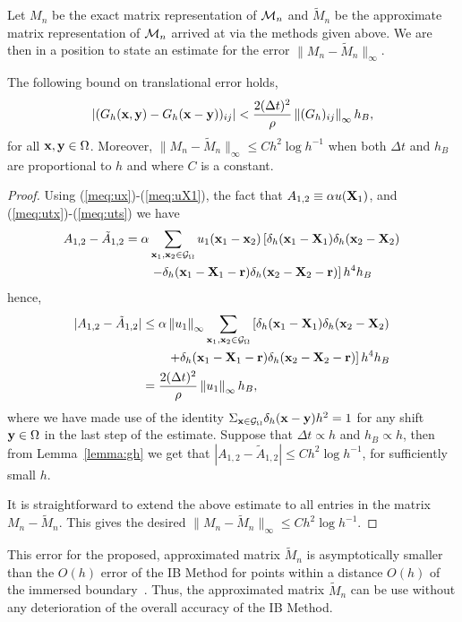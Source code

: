 Let $M_n$ be the exact matrix representation of $\mathcal{M}_n$ and $\tilde{M}_n$ be the approximate matrix representation of $\mathcal{M}_n$ arrived at via the methods given above. 
We are then in a position to state an estimate for the error $\|M_n-\tilde{M}_n\|_{\infty}$.
\begin{theorem}
\label{thm:A}
The following bound on translational error holds,
\begin{equation}
|(G_h(\mathbf{x},\mathbf{y})-G_h(\mathbf{x}-\mathbf{y}))_{ij}|
< 
\frac{2(\Delta t)^2}{\rho} \left\lVert(G_h)_{ij}\right\rVert_\infty h_B,
\label{meq:TranslationBound_Preliminary}
\end{equation}
for all $\mathbf{x},\mathbf{y} \in\Omega$.
Moreover,
$\|M_n-\tilde{M}_n\|_{\infty} \leq C h^2 \log h^{-1}$ when both $\Delta t$ and $h_B$ are  proportional to $h$ and where $C$ is a constant. 
\end{theorem}
\begin{proof}
Using (\ref{meq:ux})-(\ref{meq:uX1}), the fact that $A_{1,2} \equiv \alpha u(\mathbf{X}_1)$, and (\ref{meq:utx})-(\ref{meq:uts}) we have
\begin{align}
\begin{split}
A_{1,2}-\tilde{A}_{1,2} &= 
\alpha\sum_{\mathbf{x}_1,\mathbf{x}_2\in\mathcal{G}_\Omega}
u_1(\mathbf{x}_1 - \mathbf{x}_2)
\left[
\delta_h(\mathbf{x}_1 - \mathbf{X}_1)
\delta_h(\mathbf{x}_2 - \mathbf{X}_2) \right. \\ &\qquad\left.
-
\delta_h(\mathbf{x}_1 - \mathbf{X}_1 - \mathbf{r})
\delta_h(\mathbf{x}_2 - \mathbf{X}_2 - \mathbf{r})
\right]h^4h_B
\end{split}
\end{align}
hence,
\begin{align}
\begin{split}
|A_{1,2}-\tilde{A}_{1,2}|
&\leq 
\alpha\left\lVert u_1\right\rVert_\infty
\sum_{\mathbf{x}_1,\mathbf{x}_2\in\mathcal{G}_\Omega}
\left[
\delta_h(\mathbf{x}_1 - \mathbf{X}_1)
\delta_h(\mathbf{x}_2 - \mathbf{X}_2) \right. \\ &\qquad\left.
+
\delta_h(\mathbf{x}_1 - \mathbf{X}_1 - \mathbf{r})
\delta_h(\mathbf{x}_2 - \mathbf{X}_2 - \mathbf{r})
\right]h^4h_B \\
&=
\frac{2(\Delta t)^2}{\rho} \left\lVert u_1\right\rVert_\infty h_B,
\end{split}
\end{align}
where we have made use of the identity $\Sigma_{\mathbf{x}\in\mathcal{G}_\Omega}\delta_h(\mathbf{x}-\mathbf{y})h^2=1$ for any shift $\mathbf{y}\in\Omega$ in the last step of the estimate.
Suppose that $\Delta t \propto h$ and $h_B \propto h$, then  from Lemma~\ref{lemma:gh} we get that 
$|A_{1,2}-\tilde{A}_{1,2}| \leq C h^2 \log h^{-1}$, for sufficiently small
$h$.

It is straightforward to extend the above estimate to all entries in the matrix $M_n-\tilde{M}_n$. This gives the desired $\|M_n-\tilde{M}_n\|_{\infty} \leq C h^2 \log h^{-1}$.
\end{proof}
This error for the proposed, approximated matrix $\tilde{M}_n$
is asymptotically smaller than the $O(h)$ error of the IB Method for points within a distance $O(h)$ of the immersed boundary~\cite{Mori2008}. Thus,  the approximated matrix $\tilde{M}_n$ can be use without any deterioration of the overall accuracy of the IB Method.


